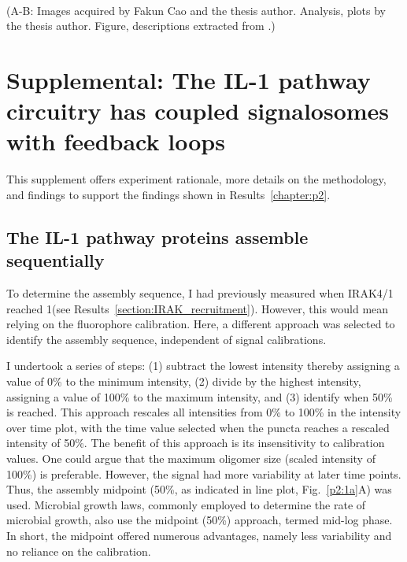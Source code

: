 \begin{centering}
{\vspace{1em}
\\
(A-B: Images acquired by Fakun Cao and the thesis author. Analysis, plots by the thesis author. Figure, descriptions extracted from \autocite{Deliz-Aguirre_2021}.)}
\label{p1:S5}
\end{centering}

\chapter{Supplemental: The IL-1 pathway circuitry has coupled signalosomes with feedback loops}
This supplement offers experiment rationale, more details on the methodology, and findings to support the findings shown in Results~\ref{chapter:p2}.

\section{The IL-1 pathway proteins assemble sequentially}
\label{section:sequential}
To determine the assembly sequence, I had previously measured when IRAK4/1 reached 1\times (see Results~\ref{section:IRAK_recruitment}). However, this would mean relying on the fluorophore calibration. Here, a different approach was selected to identify the assembly sequence, independent of signal calibrations.

I undertook a series of steps: (1) subtract the lowest intensity thereby assigning a value of 0\% to the minimum intensity, (2) divide by the highest intensity, assigning a value of 100\% to the maximum intensity, and (3) identify when 50\% is reached. This approach rescales all intensities from 0\% to 100\% in the intensity over time plot, with the time value selected when the puncta reaches a rescaled intensity of 50\%. The benefit of this approach is its insensitivity to calibration values. One could argue that the maximum oligomer size (scaled intensity of 100\%) is preferable. However, the signal had more variability at later time points. Thus, the assembly midpoint (50\%, as indicated in line plot, Fig.~\ref{p2:1a}A) was used. Microbial growth laws, commonly employed to determine the rate of microbial growth, also use the midpoint (50\%) approach, termed mid-log phase. In short, the midpoint offered numerous advantages, namely less variability and no reliance on the calibration.

